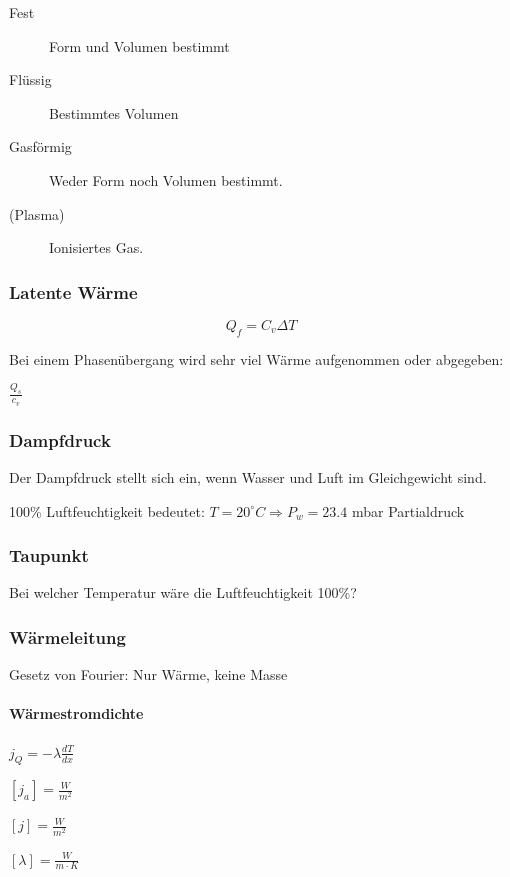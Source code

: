 \documentclass[a4paper]{scrartcl}
\begin{document}
\begin{description}
	\item[Fest] Form und Volumen bestimmt
	\item[Flüssig] Bestimmtes Volumen
	\item[Gasförmig] Weder Form noch Volumen bestimmt.
	\item[(Plasma)] Ionisiertes Gas.
\end{description}


\subsubsection{Latente Wärme}


\[
Q_f = C_v \Delta T
\]


Bei einem Phasenübergang wird sehr viel Wärme aufgenommen oder abgegeben:

$ \frac{Q_s}{c_v}$




\subsubsection{Dampfdruck}


Der Dampfdruck stellt sich ein, wenn Wasser und Luft im Gleichgewicht sind.

100\% Luftfeuchtigkeit bedeutet: $T = 20^\circ C \Rightarrow P_w = 23.4$ mbar Partialdruck


\subsubsection{Taupunkt}

Bei welcher Temperatur wäre die Luftfeuchtigkeit 100\%?


\subsubsection{Wärmeleitung}
Gesetz von Fourier: Nur Wärme, keine Masse

\paragraph{Wärmestromdichte} $j_Q = - \lambda \frac{dT}{dx}$


$[j_a] = \frac{W}{m^2}$


$[j] = \frac{W}{m^2}$

$[\lambda] = \frac{W}{m \cdot K}$
\end{document}
